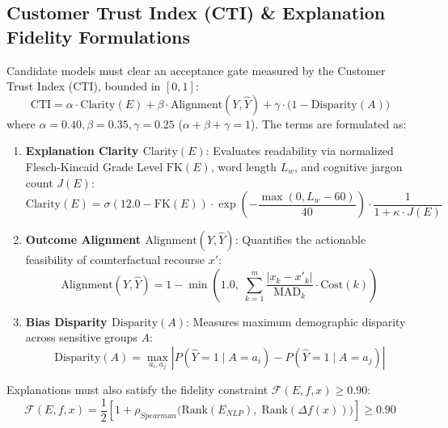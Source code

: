 \documentclass[journal]{IEEEtran}
\begin{document}
\subsection{Customer Trust Index (CTI) \& Explanation Fidelity Formulations}
Candidate models must clear an acceptance gate measured by the Customer Trust Index (CTI), bounded in $[0, 1]$:
\begin{equation}
\text{CTI} = \alpha \cdot \text{Clarity}(E) + \beta \cdot \text{Alignment}(Y, \hat{Y}) + \gamma \cdot \Big( 1 - \text{Disparity}(A) \Big)
\label{eq:cti}
\end{equation}
where $\alpha=0.40, \beta=0.35, \gamma=0.25$ ($\alpha + \beta + \gamma = 1$). The terms are formulated as:
\begin{enumerate}
    \item \textbf{Explanation Clarity $\text{Clarity}(E)$}: Evaluates readability via normalized Flesch-Kincaid Grade Level $\text{FK}(E)$, word length $L_w$, and cognitive jargon count $J(E)$:
    \begin{equation}
    \text{Clarity}(E) = \sigma\left( 12.0 - \text{FK}(E) \right) \cdot \exp\left( - \frac{\max(0, L_w - 60)}{40} \right) \cdot \frac{1}{1 + \kappa \cdot J(E)}
    \end{equation}
    \item \textbf{Outcome Alignment $\text{Alignment}(Y, \hat{Y})$}: Quantifies the actionable feasibility of counterfactual recourse $x'$:
    \begin{equation}
    \text{Alignment}(Y, \hat{Y}) = 1 - \min\left( 1.0, \; \sum_{k=1}^{m} \frac{|x_k - x'_k|}{\text{MAD}_k} \cdot \text{Cost}(k) \right)
    \end{equation}
    \item \textbf{Bias Disparity $\text{Disparity}(A)$}: Measures maximum demographic disparity across sensitive groups $A$:
    \begin{equation}
    \text{Disparity}(A) = \max_{a_i, a_j} \left| P(\hat{Y}=1 \mid A=a_i) - P(\hat{Y}=1 \mid A=a_j) \right|
    \end{equation}
\end{enumerate}
Explanations must also satisfy the fidelity constraint $\mathcal{F}(E, f, x) \ge 0.90$:
\begin{equation}
\mathcal{F}(E, f, x) = \frac{1}{2} \left[ 1 + \rho_{Spearman}\Big( \text{Rank}(E_{NLP}), \; \text{Rank}(\Delta f(x)) \Big) \right] \ge 0.90
\end{equation}
\end{document}
